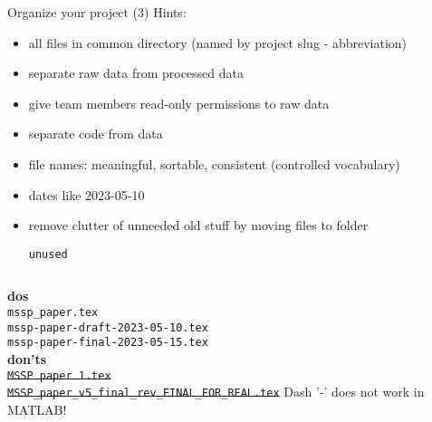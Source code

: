 \documentclass[10pt,aspectratio=169]{beamer} %
\begin{document}
\begin{frame}[t,label=frame11]{Organize your project (3)}
Hints:
\begin{itemize}
	\item all files in common directory (named by project slug - abbreviation) 
	\item separate raw data from processed data
	\item give team members read-only permissions to raw data
	\item separate code from data
	\item file names: meaningful, sortable, consistent (controlled vocabulary)
	\item dates like 2023-05-10
	\item remove clutter of unneeded old stuff by moving files to folder 
	\texttt{unused}
\end{itemize}	
\begin{columns}[T]
	\hspace{5mm}
	\textbf{dos}\\
	\texttt{mssp\_paper.tex}\\
	\texttt{mssp-paper-draft-2023-05-10.tex}\\
	\texttt{mssp-paper-final-2023-05-15.tex}\\
	\textbf{don'ts}\\
	\sout{\texttt{MSSP paper 1.tex}}\\
	\sout{\texttt{MSSP\_paper\_v5\_final\_rev\_FINAL\_FOR\_REAL.tex}}
	\alert{Dash '-' does not work in MATLAB!}
\end{columns}

\end{frame}
\end{document}

